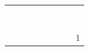 \begin{table}[]
\begin{tabular}{|l|l|l|l|l|l|l|l|l|}
		&                              &                                                    &         &                                                    &         &                                                    &         &                                                 \\ \hline
		&                              &                                                    &         &                                                    &         &                                                    &         &                                                 \\ \hline
		&                              &                                                    &         &                                                    &         &                                                    &         &                                                 \\ \hline
		&                              &                                                    &         &                                                    &         &                                                    &         &                                                 \\ \hline
		&                              &                                                    &         &                                                    &         &                                                    &         &                                                 \\ \hline
		&                              &                                                    &         &                                                    &         &                                                    &         &                                                 \\ \hline
		&                              &                                                    &         &                                                    &         &                                                    &         &                                                 \\ \hline
		&                              &                                                    &         &                                                    &         &                                                    &         &                                                 \\ \hline
		&                              &                                                    &         &                                                    &         &                                                    &         &                                                 \\ \hline
		&                              &                                                    &         &                                                    &         &                                                    &         & 1                                               \\ \hline
	\end{tabular}
\end{table} 
